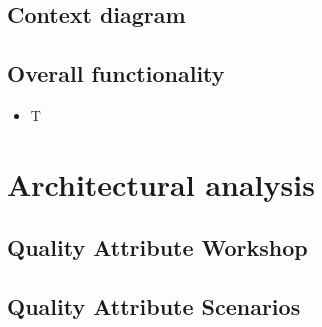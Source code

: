 \documentclass[10pt]{article}
\begin{document}
\subsection{Context diagram}


\subsection{Overall functionality}
\begin{itemize}
    \item T
\end{itemize}
 

\section{Architectural analysis}

\subsection{Quality Attribute Workshop}

\subsection{Quality Attribute Scenarios}
\end{document}
